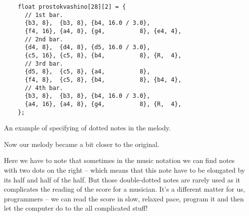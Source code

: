 \documentclass[../sparc.tex]{subfiles}
\begin{document}
\begin{listing}[ht]
  \begin{verbatim}
    float prostokvashino[28][2] = {
      // 1st bar.
      {b3, 8},  {b3, 8}, {b4, 16.0 / 3.0},
      {f4, 16}, {a4, 8}, {g4,          8}, {e4, 4},
      // 2nd bar.
      {d4, 8},  {d4, 8}, {d5, 16.0 / 3.0},
      {c5, 16}, {c5, 8}, {b4,          8}, {R,  4},
      // 3rd bar.
      {d5, 8},  {c5, 8}, {a4,          8},
      {f4, 8},  {c5, 8}, {b4,          8}, {b4, 4},
      // 4th bar.
      {b3, 8},  {b3, 8}, {b4, 16.0 / 3.0},
      {a4, 16}, {a4, 8}, {g4,          8}, {R,  4},
    };
  \end{verbatim}
  \label{listing:music-dotted-notes}
  \caption{An example of specifying of dotted notes in the melody.}
\end{listing}

Now our melody became a bit closer to the original.

Here we have to note that sometimes in the music notation we can find notes with
two dots on the right -- which means that this note have to be elongated by its
half and half of the half.  But those double-dotted notes are rarely used as it
complicates the reading of the score for a musician.  It's a different matter
for us, programmers -- we can read the score in slow, relaxed pace, program it
and then let the computer do to the all complicated stuff!
\end{document}

